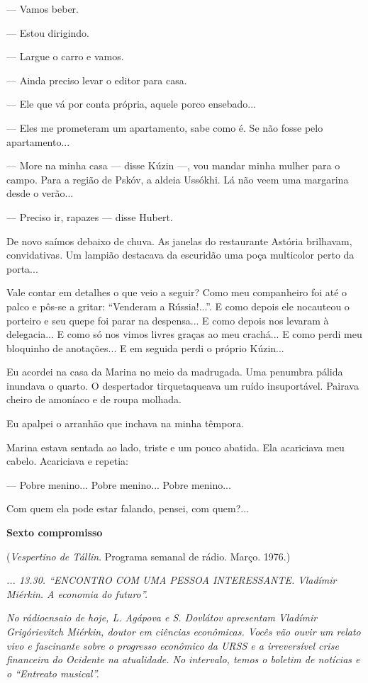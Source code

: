 --- Vamos beber.

--- Estou dirigindo.

--- Largue o carro e vamos.

--- Ainda preciso levar o editor para casa.

--- Ele que vá por conta própria, aquele porco ensebado...

--- Eles me prometeram um apartamento, sabe como é. Se não fosse pelo
apartamento...

--- More na minha casa --- disse Kúzin ---, vou mandar minha mulher para
o campo. Para a região de Pskóv, a aldeia Ussókhi. Lá não veem uma
margarina desde o verão...

--- Preciso ir, rapazes --- disse Hubert.

De novo saímos debaixo de chuva. As janelas do restaurante Astória
brilhavam, convidativas. Um lampião destacava da escuridão uma poça
multicolor perto da porta...

Vale contar em detalhes o que veio a seguir? Como meu companheiro foi
até o palco e pôs-se a gritar: ``Venderam a Rússia!...''. E como depois
ele nocauteou o porteiro e seu quepe foi parar na despensa... E como
depois nos levaram à delegacia... E como só nos vimos livres graças ao
meu crachá... E como perdi meu bloquinho de anotações... E em seguida
perdi o próprio Kúzin...

Eu acordei na casa da Marina no meio da madrugada. Uma penumbra pálida
inundava o quarto. O despertador tirquetaqueava um ruído insuportável.
Pairava cheiro de amoníaco e de roupa molhada.

Eu apalpei o arranhão que inchava na minha têmpora.

Marina estava sentada ao lado, triste e um pouco abatida. Ela acariciava
meu cabelo. Acariciava e repetia:

--- Pobre menino... Pobre menino... Pobre menino...

Com quem ela pode estar falando, pensei, com quem?...

\textbf{Sexto compromisso}

(\emph{Vespertino de Tállin}. Programa semanal de rádio. Março. 1976.)

\emph{... 13.30. ``ENCONTRO COM UMA PESSOA INTERESSANTE. Vladímir
Miérkin. A economia do futuro''.}

\emph{No rádioensaio de hoje, L. Agápova e S. Dovlátov apresentam
Vladímir Grigórievitch Miérkin, doutor em ciências econômicas. Vocês vão
ouvir um relato vivo e fascinante sobre o progresso econômico da URSS e
a irreversível crise financeira do Ocidente na atualidade. No intervalo,
temos o boletim de notícias e o ``Entreato musical''.}

